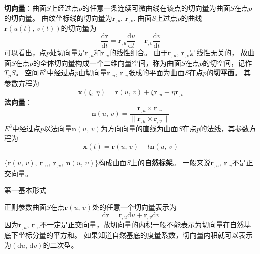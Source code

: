 \textbf{切向量}：曲面$S$上经过点$p$的任意一条连续可微曲线在该点的切向量为曲面$S$在点$p$的切向量。
曲纹坐标线的切向量为$\mathbf{r}_{,u}$, $\mathbf{r}_{,v}$. 
曲面$S$上过点$p$的曲线$\mathbf{r}\left(u(t),\,v(t)\right)$的切向量为
\begin{equation}
    \frac{\mathrm{d}\mathbf{r}}{\mathrm{d}t} = \mathbf{r}_{,u}\frac{\mathrm{d}u}{\mathrm{d}t} + 
    \mathbf{r}_{,v}\frac{\mathrm{d}v}{\mathrm{d}t}
\end{equation}
可以看出，点$p$处切向量是$\mathbf{r}_{,u}$和$\mathbf{r}_{,v}$的线性组合。
由于$\mathbf{r}_{,u}$, $\mathbf{r}_{,v}$是线性无关的，
故曲面$S$在点$p$的全体切向量构成一个二维向量空间，称为曲面$S$在点$p$的切空间，记作$T_{p}S$。
空间$E^{3}$中经过点$p$由切向量$\mathbf{r}_{,u}$, $\mathbf{r}_{,v}$张成的平面为曲面$S$在点$p$的\textbf{切平面}。
其参数方程为
\begin{equation}
    \mathbf{x}\left(\xi,\,\eta\right)=\mathbf{r}\left(u,\, v\right) + \xi\mathbf{r}_{,u} + \eta\mathbf{r}_{,v}
\end{equation}
\textbf{法向量}：
\begin{equation}
    \mathbf{n}\left(u,\,v\right)=\frac{\mathbf{r}_{,u}\times\mathbf{r}_{,v}}{\|\mathbf{r}_{,u}\times\mathbf{r}_{,v}\|}
\end{equation}
$E^{3}$中经过点$p$以法向量$\mathbf{n}\left(u,\,v\right)$为方向向量的直线为曲面$S$在点$p$的法线，其参数方程为
\begin{equation}
    \mathbf{x}\left(t\right)=\mathbf{r}\left(u,\, v\right) + t\mathbf{n}\left(u,\,v\right)
\end{equation}

$\{\mathbf{r}\left(u,\, v\right),\ \mathbf{r}_{,u},\ \mathbf{r}_{,v},\ \mathbf{n}\left(u,\,v\right)\}$构成曲面$S$上的\textbf{自然标架}。
一般来说$\mathbf{r}_{,u},\ \mathbf{r}_{,v}$不是正交向量。

第一基本形式

正则参数曲面$S$在点$\mathbf{r}\left(u,\,v\right)$处的任意一个切向量表示为
\begin{equation}\label{eq:first-diff}
    \mathrm{d}\mathbf{r} = \mathbf{r}_{,u}\mathrm{d}u + \mathbf{r}_{,v}\mathrm{d}v
\end{equation}
因为$\mathbf{r}_{,u},\ \mathbf{r}_{,v}$不一定是正交向量，故切向量的内积一般不能表示为切向量在自然基底下坐标分量的平方和。
如果知道自然基底的度量系数，切向量内积就可以表示为$\left(\mathrm{d}u,\,\mathrm{d}v\right)$的二次型。

